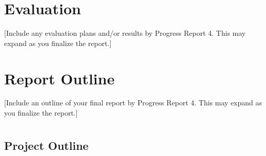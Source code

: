 \documentclass{jdf}
\begin{document}
\section*{Evaluation}

[Include any evaluation plans and/or results by Progress Report 4. This may expand as you finalize the report.]

\section*{Report Outline}

[Include an outline of your final report by Progress Report 4. This may expand as you finalize the report.]

\nocite{*}



\section*{}




\subsection*{Project Outline}
\label{appendix:outline}

\end{document}
